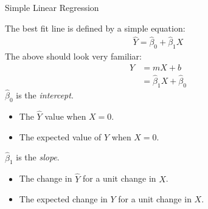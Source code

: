 \documentclass[10pt]{beamer}\usepackage[]{graphicx}\usepackage[]{color}
\begin{document}
\watermarkon %



\begin{frame}{Simple Linear Regression}

  The best fit line is defined by a simple equation:
  \begin{align*}
    \hat{Y} = \hat{\beta}_0 + \hat{\beta}_1 X
  \end{align*}
  The above should look very familiar:
  \begin{align*}
    Y &= m X + b\\
      &= \hat{\beta}_1 X + \hat{\beta}_0
  \end{align*}
  $\hat{\beta}_0$ is the \emph{intercept}.
  \begin{itemize}
  \item The $\hat{Y}$ value when $X = 0$.
  \item The expected value of $Y$ when $X = 0$.
  \end{itemize}
  \vb
  $\hat{\beta}_1$ is the \emph{slope}.
  \begin{itemize}
  \item The change in $\hat{Y}$ for a unit change in $X$.
  \item The expected change in $Y$ for a unit change in $X$.
  \end{itemize}

\end{frame}

\watermarkoff %
\end{document}
